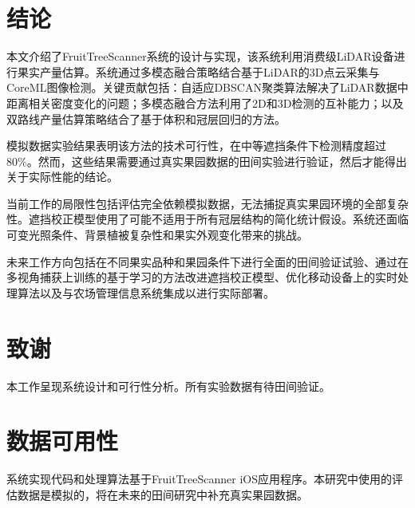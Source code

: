 \section{结论}
\label{sec:conclusion}

本文介绍了FruitTreeScanner系统的设计与实现，该系统利用消费级LiDAR设备进行果实产量估算。系统通过多模态融合策略结合基于LiDAR的3D点云采集与CoreML图像检测。关键贡献包括：自适应DBSCAN聚类算法解决了LiDAR数据中距离相关密度变化的问题；多模态融合方法利用了2D和3D检测的互补能力；以及双路线产量估算策略结合了基于体积和冠层回归的方法。

模拟数据实验结果表明该方法的技术可行性，在中等遮挡条件下检测精度超过80\%。然而，这些结果需要通过真实果园数据的田间实验进行验证，然后才能得出关于实际性能的结论。

当前工作的局限性包括评估完全依赖模拟数据，无法捕捉真实果园环境的全部复杂性。遮挡校正模型使用了可能不适用于所有冠层结构的简化统计假设。系统还面临可变光照条件、背景植被复杂性和果实外观变化带来的挑战。

未来工作方向包括在不同果实品种和果园条件下进行全面的田间验证试验、通过在多视角捕获上训练的基于学习的方法改进遮挡校正模型、优化移动设备上的实时处理算法以及与农场管理信息系统集成以进行实际部署。

\section*{致谢}
本工作呈现系统设计和可行性分析。所有实验数据有待田间验证。

\section*{数据可用性}
系统实现代码和处理算法基于FruitTreeScanner iOS应用程序。本研究中使用的评估数据是模拟的，将在未来的田间研究中补充真实果园数据。